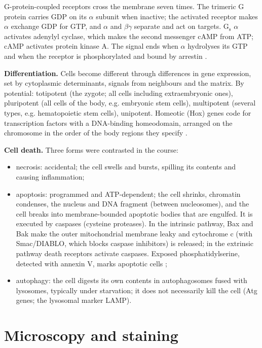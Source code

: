 G-protein-coupled receptors cross the
membrane seven times. The trimeric G protein
carries GDP on its $\alpha$ subunit when
inactive; the activated receptor makes
$\alpha$ exchange GDP for GTP, and $\alpha$
and $\beta\gamma$ separate and act on
targets. $\mathrm{G_s}$ $\alpha$ activates
adenylyl cyclase, which makes the second
messenger cAMP from ATP; cAMP activates
protein kinase A. The signal ends when
$\alpha$ hydrolyses its GTP and when the
receptor is phosphorylated and bound by
arrestin \cite[Chapter
16]{alberts2014essential}.

\textbf{Differentiation.}
Cells become different through differences in
gene expression, set by cytoplasmic
determinants, signals from neighbours and the
matrix. By potential: totipotent (the zygote;
all cells including extraembryonic ones),
pluripotent (all cells of the body, e.g.
embryonic stem cells), multipotent (several
types, e.g. hematopoietic stem cells),
unipotent. Homeotic (Hox) genes code for
transcription factors with a DNA-binding
homeodomain, arranged on the chromosome in
the order of the body regions they specify
\cite[Chapter 20]{alberts2014essential}.

\textbf{Cell death.}
Three forms were contrasted in the course:
\begin{itemize}
\item necrosis: accidental; the cell swells
and bursts, spilling its contents and causing
inflammation;
\item apoptosis: programmed and
ATP-dependent; the cell shrinks, chromatin
condenses, the nucleus and DNA fragment
(between nucleosomes), and the cell breaks
into membrane-bounded apoptotic bodies that
are engulfed. It is executed by caspases
(cysteine proteases). In the intrinsic
pathway, Bax and Bak make the outer
mitochondrial membrane leaky and cytochrome c
(with Smac/DIABLO, which blocks caspase
inhibitors) is released; in the extrinsic
pathway death receptors activate caspases.
Exposed phosphatidylserine, detected with
annexin V, marks apoptotic cells
\cite[Chapter 18]{alberts2014essential};
\item autophagy: the cell digests its own
contents in autophagosomes fused with
lysosomes, typically under starvation; it
does not necessarily kill the cell (Atg
genes; the lysosomal marker LAMP).
\end{itemize}

\section{Microscopy and staining}
\label{section-mcb-microscopy}

